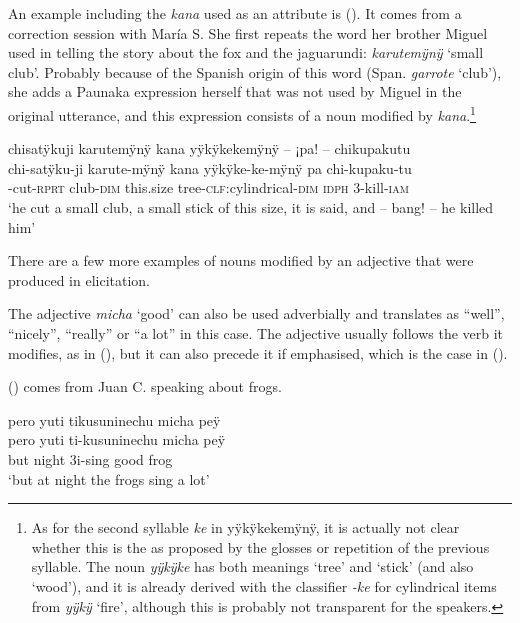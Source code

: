 An example including the  \textit{kana} used as an attribute is (). It comes from a correction session with María S. She first repeats the word her brother Miguel used in telling the story about the fox and the jaguarundi: \textit{karutemÿnÿ} ‘small club’. Probably because of the Spanish origin of this word (Span. \textit{garrote} ‘club’), she adds a Paunaka expression herself that was not used by Miguel in the original utterance, and this expression consists of a noun modified by \textit{kana}.\footnote{As for the second syllable \textit{ke} in yÿkÿkekemÿnÿ, it is actually not clear whether this is the  as proposed by the glosses or repetition of the previous syllable. The noun \textit{yÿkÿke} has both meanings ‘tree’ and ‘stick’ (and also ‘wood’), and it is already derived with the classifier \textit{-ke} for cylindrical items from \textit{yÿkÿ} ‘fire’, although this is probably not transparent for the speakers.}

\ea\label{ex:ADJ-new-ATTR-1}
\begingl
\glpreamble chisatÿkuji karutemÿnÿ kana yÿkÿkekemÿnÿ – ¡pa! – chikupakutu\\
\gla chi-satÿku-ji karute-mÿnÿ kana yÿkÿke-ke-mÿnÿ pa chi-kupaku-tu\\
-cut-\textsc{rprt} club-\textsc{dim} this.size tree-\textsc{clf:}cylindrical-\textsc{dim} \textsc{idph} 3-kill-\textsc{iam}\\
\glft ‘he cut a small club, a small stick of this size, it is said, and – bang! – he killed him’
\endgl
\trailingcitation{[rxx-e150220s-2]}
\xe

There are a few more examples of nouns modified by an adjective that were produced in elicitation. 

The adjective \textit{micha} ‘good’ can also be used adverbially and translates as “well”, “nicely”, “really” or “a lot” in this case. The adjective usually follows the verb it modifies, as in (), but it can also precede it if emphasised, which is the case in ().

() comes from Juan C. speaking about frogs.

\ea\label{ex:ADJ-Adv-1}
\begingl
\glpreamble pero yuti tikusuninechu micha peÿ\\
\gla pero yuti ti-kusuninechu micha peÿ\\
\glb but night 3i-sing good frog\\
\glft ‘but at night the frogs sing a lot’
\endgl
\trailingcitation{[mqx-p110826l.617-618]}
\xe

